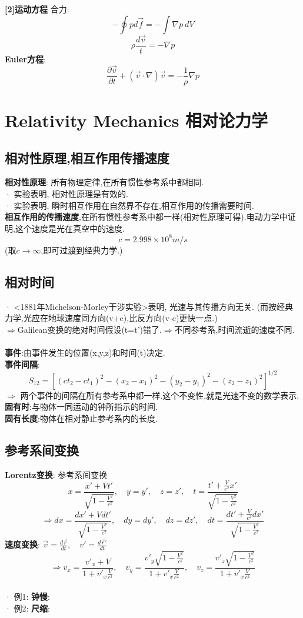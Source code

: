 \documentclass{article}
\begin{document}
\textbf{[2]运动方程}
合力:
$$-\oint p d \vec f = -\int \nabla p\ dV$$
$$\rho \frac{d \vec v}{t} = -\nabla p$$
\textbf{Euler方程}:
$$\frac{\partial \vec v}{\partial t} + (\vec v \cdot \nabla)\vec v = - \frac{1}{\rho}\nabla p$$


\section{Relativity Mechanics 相对论力学}
\subsection{相对性原理,相互作用传播速度}
\textbf{相对性原理}: 所有物理定律,在所有惯性参考系中都相同.\\
· 实验表明, 相对性原理是有效的.\\
· 实验表明, 瞬时相互作用在自然界不存在,相互作用的传播需要时间.\\
\textbf{相互作用的传播速度},在所有惯性参考系中都一样(相对性原理可得).\quad 电动力学中证明,这个速度是光在真空中的速度.
$$c = 2.998 \times 10^8 m/s$$
(取$c\to \infty$,即可过渡到经典力学.)


\subsection{相对时间}
· <1881年Michelson-Morley干涉实验>表明, 光速与其传播方向无关. (而按经典力学,光应在地球速度同方向(v+c),比反方向(v-c)更快一点.)\\
$\Rightarrow$Galilean变换的绝对时间假设(t=t')错了.\quad  $\Rightarrow$不同参考系,时间流逝的速度不同.\\
\\
\textbf{事件}:由事件发生的位置(x,y,z)和时间(t)决定.\\
\textbf{事件间隔}:
$$S_{12} = [(ct_2-ct_1)^2 - (x_2-x_1)^2 - (y_2-y_1)^2 - (z_2-z_1)^2]^{1/2}$$
$\Rightarrow$ 两个事件的间隔在所有参考系中都一样.\quad 这个不变性,就是光速不变的数学表示.\\
\textbf{固有时}:与物体一同运动的钟所指示的时间.\\
\textbf{固有长度}:物体在相对静止参考系内的长度.


\subsection{参考系间变换}
\textbf{Lorentz变换}: 参考系间变换
$$ x = \frac{x' + V t'}{\sqrt{1 - \frac{V^2}{c^2}}},\quad y=y',\quad z=z', \quad t = \frac{t'+ \frac{V}{c^2}x'}{\sqrt{1 - \frac{V^2}{c^2}}}$$
$$ \Rightarrow dx = \frac{dx' + V dt'}{\sqrt{1 - \frac{V^2}{c^2}}},\quad dy=dy',\quad dz=dz', \quad dt = \frac{dt'+ \frac{V}{c^2}dx'}{\sqrt{1 - \frac{V^2}{c^2}}}$$
\textbf{速度变换}: $\vec v = \frac{d\vec r}{dt},\quad v' = \frac{d\vec r'}{dt}$
$$\Rightarrow v_x = \frac{v'_x + V}{1 + v'_x \frac{V}{c^2}}, \quad v_y = \frac{v'_y \sqrt{1 - \frac{V^2}{c^2}}}{1 + v'_x \frac{V}{c^2}},\quad v_z = \frac{v'_z \sqrt{1 - \frac{V^2}{c^2}}}{1 + v'_x \frac{V}{c^2}}$$\\
· 例1: \textbf{钟慢}:\\
· 例2: \textbf{尺缩}:\\
\end{document}
